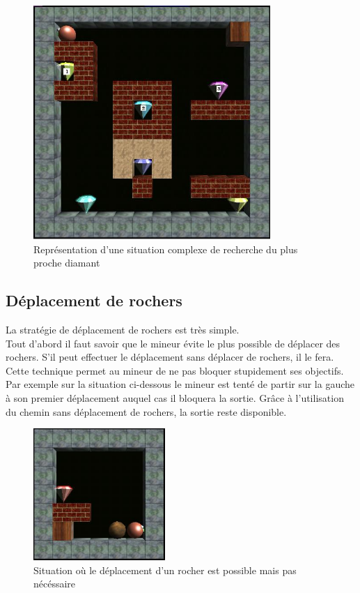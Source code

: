\documentclass[a4paper,11pt]{article}
\begin{document}
		\begin{figure}[h]
			\center
			\includegraphics[width=9cm]{simple2}
			\caption{\label{complexeRechercheDiamant} Repr\'esentation d'une situation complexe de recherche du plus proche diamant}
		\end{figure}
		
	\newpage
	\subsection{D\'eplacement de rochers}
	
La strat\'egie de d\'eplacement de rochers est tr\`es simple.\\
Tout d'abord il faut savoir que le mineur \'evite le plus possible de d\'eplacer des rochers. S'il peut effectuer le d\'eplacement sans d\'eplacer de rochers, il le fera. Cette technique permet au mineur de ne pas bloquer stupidement ses objectifs. Par exemple sur la situation ci-dessous le mineur est tent\'e de partir sur la gauche \`a son premier d\'eplacement auquel cas il bloquera la sortie. Gr\^ace \`a l'utilisation du chemin sans d\'eplacement de rochers, la sortie reste disponible.

		\begin{figure}[h]
			\center
			\includegraphics[width=5cm]{rochers1}
			\caption{\label{deplacementRocher1} Situation o\`u le d\'eplacement d'un rocher est possible mais pas n\'ec\'essaire}
		\end{figure}
		
\end{document}
